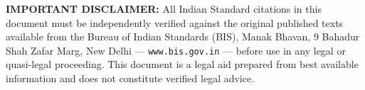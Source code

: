\documentclass[12pt, a4paper]{article}
\begin{document}
\vspace{1cm}
\begin{mdframed}[linecolor=red!60, linewidth=1pt, backgroundcolor=lightred]
\textbf{IMPORTANT DISCLAIMER:} All Indian Standard citations in this document must be independently verified against the original published texts available from the Bureau of Indian Standards (BIS), Manak Bhavan, 9 Bahadur Shah Zafar Marg, New Delhi --- \texttt{www.bis.gov.in} --- before use in any legal or quasi-legal proceeding. This document is a legal aid prepared from best available information and does not constitute verified legal advice.
\end{mdframed}
\end{document}
